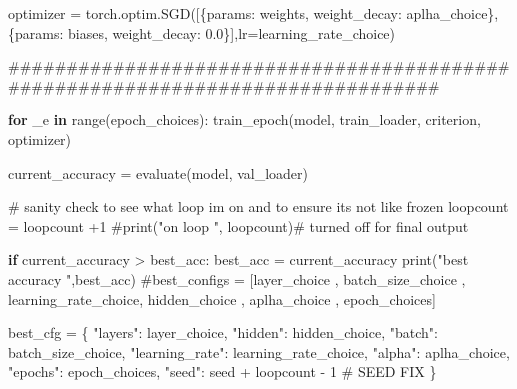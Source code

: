 \documentclass[
  letterpaper,
  DIV=11,
  numbers=noendperiod]{scrartcl}
\newenvironment{Shaded}{\begin{snugshade}}{\end{snugshade}}
\newcommand{\BuiltInTok}[1]{\textcolor[rgb]{0.00,0.23,0.31}{#1}}
\newcommand{\CommentTok}[1]{\textcolor[rgb]{0.37,0.37,0.37}{#1}}
\newcommand{\ControlFlowTok}[1]{\textcolor[rgb]{0.00,0.23,0.31}{\textbf{#1}}}
\newcommand{\DecValTok}[1]{\textcolor[rgb]{0.68,0.00,0.00}{#1}}
\newcommand{\FloatTok}[1]{\textcolor[rgb]{0.68,0.00,0.00}{#1}}
\newcommand{\KeywordTok}[1]{\textcolor[rgb]{0.00,0.23,0.31}{\textbf{#1}}}
\newcommand{\NormalTok}[1]{\textcolor[rgb]{0.00,0.23,0.31}{#1}}
\newcommand{\OperatorTok}[1]{\textcolor[rgb]{0.37,0.37,0.37}{#1}}
\newcommand{\StringTok}[1]{\textcolor[rgb]{0.13,0.47,0.30}{#1}}
\begin{document}
\begin{Shaded}
\begin{Highlighting}[]
\NormalTok{        optimizer }\OperatorTok{=}\NormalTok{ torch.optim.SGD([\{}\StringTok{\textquotesingle{}params\textquotesingle{}}\NormalTok{: weights, }\StringTok{\textquotesingle{}weight\_decay\textquotesingle{}}\NormalTok{: aplha\_choice\},\{}\StringTok{\textquotesingle{}params\textquotesingle{}}\NormalTok{: biases,   }\StringTok{\textquotesingle{}weight\_decay\textquotesingle{}}\NormalTok{: }\FloatTok{0.0}\NormalTok{\}],lr}\OperatorTok{=}\NormalTok{learning\_rate\_choice)}




        \CommentTok{\#\#\#\#\#\#\#\#\#\#\#\#\#\#\#\#\#\#\#\#\#\#\#\#\#\#\#\#\#\#\#\#\#\#\#\#\#\#\#\#\#\#\#\#\#\#\#\#\#\#\#\#\#\#\#\#\#\#\#\#\#\#\#\#\#\#\#\#\#\#\#\#\#\#\#\#\#\#\#\#}

        \ControlFlowTok{for}\NormalTok{ \_e }\KeywordTok{in} \BuiltInTok{range}\NormalTok{(epoch\_choices):}
\NormalTok{            train\_epoch(model, train\_loader, criterion, optimizer)}

\NormalTok{        current\_accuracy }\OperatorTok{=}\NormalTok{ evaluate(model, val\_loader)}

        \CommentTok{\# sanity check to see what loop im on and to ensure its not like frozen}
\NormalTok{        loopcount }\OperatorTok{=}\NormalTok{ loopcount }\OperatorTok{+}\DecValTok{1}
        \CommentTok{\#print("on loop ", loopcount)\# turned off for final output}

        \ControlFlowTok{if}\NormalTok{ current\_accuracy }\OperatorTok{\textgreater{}}\NormalTok{ best\_acc:}
\NormalTok{            best\_acc }\OperatorTok{=}\NormalTok{ current\_accuracy}
            \BuiltInTok{print}\NormalTok{(}\StringTok{"best accuracy "}\NormalTok{,best\_acc)}
            \CommentTok{\#best\_configs = [layer\_choice , batch\_size\_choice , learning\_rate\_choice, hidden\_choice , aplha\_choice , epoch\_choices]}

\NormalTok{            best\_cfg }\OperatorTok{=}\NormalTok{ \{}
                    \StringTok{"layers"}\NormalTok{: layer\_choice,}
                    \StringTok{"hidden"}\NormalTok{: hidden\_choice,}
                    \StringTok{"batch"}\NormalTok{: batch\_size\_choice,}
                    \StringTok{"learning\_rate"}\NormalTok{: learning\_rate\_choice,}
                    \StringTok{"alpha"}\NormalTok{: aplha\_choice,}
                    \StringTok{"epochs"}\NormalTok{: epoch\_choices,}
                    \StringTok{"seed"}\NormalTok{: seed }\OperatorTok{+}\NormalTok{ loopcount }\OperatorTok{{-}} \DecValTok{1}  \CommentTok{\# SEED FIX}
\NormalTok{                \}}


\end{Highlighting}
\end{Shaded}
\end{document}
